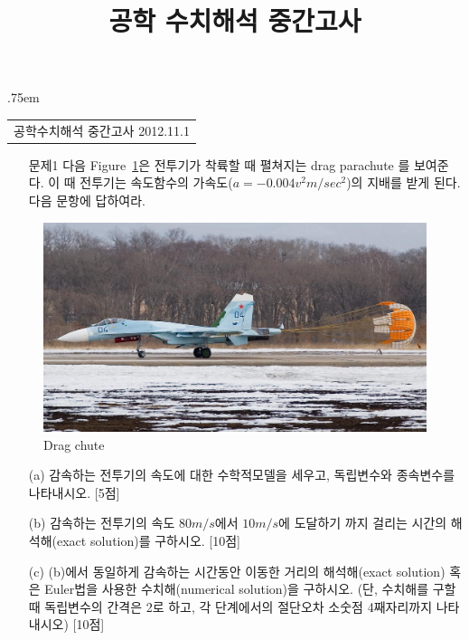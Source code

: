 \documentclass[a4,10pt]{article}
\title{공학 수치해석 중간고사}
\author{}
\makeatletter
\theoremstyle{examplestyle}
\renewcommand{\tableofcontents}[1][\contentsname]{%
  \section*{#1}
  \begin{multicols}{2}
    \@starttoc{toc}
  \end{multicols}
}
\makeatother
\begin{document}
\begin{center}
{\lineskip .75em\begin{tabular}[t]{c}\LARGE{공학수치해석 중간고사} \large{2012.11.1}\end{tabular}\par}%
\end{center}

\begin{itemize}
\item[문제1] 다음 Figure~\ref{fig:e1}은 전투기가 착륙할 때 펼쳐지는 drag parachute 를 보여준다. 이 때 전투기는 속도함수의 가속도($a=-0.004v^2 m/sec^2$)의 지배를 받게 된다. 다음 문항에 답하여라.
\end{itemize}
\begin{figure}[!hbpt]
\centering
\includegraphics[keepaspectratio=true,width=0.6\linewidth]{midterm/dragchute.eps}
\caption{Drag chute}
\label{fig:e1}
\end{figure}
\begin{itemize}
\item[(a)] 감속하는 전투기의 속도에 대한 수학적모델을 세우고, 독립변수와 종속변수를 나타내시오. [5점]
\item[(b)] 감속하는 전투기의 속도 $80m/s$에서 $10m/s$에 도달하기 까지 걸리는 시간의 해석해(exact solution)를 구하시오. [10점]
\item[(c)] (b)에서 동일하게 감속하는 시간동안 이동한 거리의 해석해(exact solution) 혹은 Euler법을 사용한 수치해(numerical solution)을 구하시오. (단, 수치해를 구할때 독립변수의 간격은 2로 하고, 각 단계에서의 절단오차 소숫점 4째자리까지 나타내시오) [10점]
\end{itemize}
\end{document}
